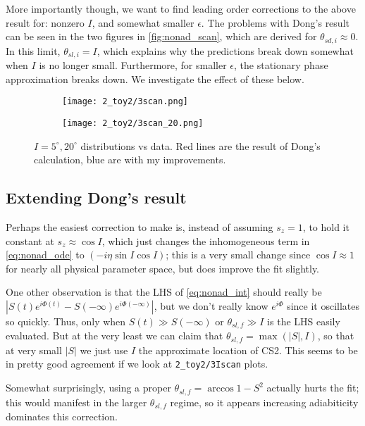 \documentclass[11pt,
        usenames, %
        dvipsnames %
    ]{article}
\newcommand*{\abs}[1]{\left|#1\right|}
\newcommand*{\p}[1]{\left(#1\right)}
\begin{document}
More importantly though, we want to find leading order corrections to the above
result for: nonzero $I$, and somewhat smaller $\epsilon$. The problems with
Dong's result can be seen in the two figures in \autoref{fig:nonad_scan}, which
are derived for $\theta_{sd, i} \approx 0$. In this limit, $\theta_{sl, i} = I$,
which explains why the predictions break down somewhat when $I$ is no longer
small. Furthermore, for smaller $\epsilon$, the stationary phase approximation
breaks down. We investigate the effect of these below.
\begin{figure}[t]
    \centering
    \begin{subfigure}{0.45\textwidth}
        \centering
        \texttt{[image: 2\_toy2/3scan.png]}
    \end{subfigure}

    \begin{subfigure}{0.45\textwidth}
        \centering
        \texttt{[image: 2\_toy2/3scan\_20.png]}
    \end{subfigure}
    \caption{$I = 5^\circ, 20^\circ$ distributions vs data. Red lines are the
    result of Dong's calculation, blue are with my
    improvements.}\label{fig:nonad_scan}
\end{figure}

\subsection{Extending Dong's result}

Perhaps the easiest correction to make is, instead of assuming $s_z = 1$, to
hold it constant at $s_z \approx \cos I$, which just changes the inhomogeneous
term in \autoref{eq:nonad_ode} to $\p{-i\eta \sin I \cos I}$; this is a very
small change since $\cos I \approx 1$ for nearly all physical parameter space,
but does improve the fit slightly.

One other observation is that the LHS of \autoref{eq:nonad_int} should really be
$\abs{S\p{t}e^{i\Phi(t)} - S\p{-\infty}e^{i\Phi(-\infty)}}$, but we don't
really know $e^{i\Phi}$ since it oscillates so quickly. Thus, only when $S\p{t}
\gg S\p{-\infty}$ or $\theta_{sl, f} \gg I$ is the LHS easily evaluated. But at
the very least we can claim that $\theta_{sl, f} = \max\p{\abs{S}, I}$, so
that at very small $\abs{S}$ we just use $I$ the approximate location of CS2.
This seems to be in pretty good agreement if we look at
\lstinline{2_toy2/3Iscan} plots.

Somewhat surprisingly, using a proper $\theta_{sl, f} = \arccos 1 - S^2$
actually hurts the fit; this would manifest in the larger $\theta_{sl, f}$
regime, so it appears increasing adiabiticity dominates this correction.
\end{document}
